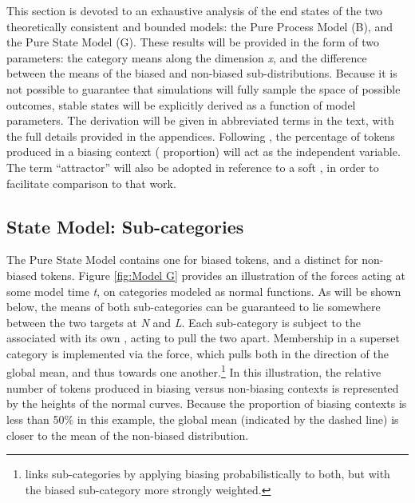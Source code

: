 This section is devoted to an exhaustive analysis of the end states
of the two theoretically consistent and bounded models: the Pure Process
Model (B), and the Pure State Model (G). These results will be provided
in the form of two parameters: the category means along the dimension
\emph{x}, and the difference between the means of the biased and non-biased
sub-distributions. Because it is not possible to guarantee that simulations
will fully sample the space of possible outcomes, stable states will
be explicitly derived as a function of model parameters. The derivation
will be given in abbreviated terms in the text, with the full details
provided in the appendices. Following \citet{soskuthy2013phonetic,Soskuthy2015},
the percentage of tokens produced in a biasing context ( proportion)
will act as the independent variable. The term “attractor” will
also be adopted in reference to a soft , in order to facilitate
comparison to that work. 

\subsection{\label{subsec:Lengthening-as-State}State Model: Sub-categories}

The Pure State Model contains one  for biased tokens, and a
distinct  for non-biased tokens. Figure \ref{fig:Model G} provides
an illustration of the forces acting at some model time \emph{t},
on  categories modeled as normal functions. As will be shown
below, the means of both sub-categories can be guaranteed to lie somewhere
between the two targets at \emph{N} and \emph{L}. Each sub-category
is subject to the  associated with its own , acting to
pull the two apart. Membership in a superset category is implemented
via the  force, which pulls both in the direction of the
global mean, and thus towards one another.\footnote{\citet{soskuthy2013phonetic} links sub-categories by applying 
biasing probabilistically to both, but with the biased sub-category
more strongly weighted. } In this illustration, the relative number of tokens produced in
biasing versus non-biasing contexts is represented by the heights
of the normal curves. Because the proportion of biasing contexts is
less than 50\% in this example, the global mean (indicated by the
dashed line) is closer to the mean of the non-biased distribution. 


